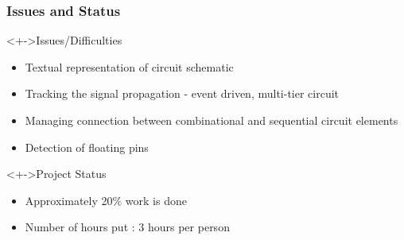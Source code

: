 \documentclass[10pt,red]{beamer}
\begin{document}
\begin{frame}
 \frametitle{Issues and Status}

\begin{block}<+->{Issues/Difficulties}
 \begin{itemize}
  \item Textual representation of circuit schematic
  \item Tracking the signal propagation - event driven, multi-tier circuit
  \item Managing connection between combinational and sequential circuit elements
  \item Detection of floating pins
 \end{itemize}

\end{block}



\begin{block}<+->{Project Status}
\begin{itemize}
 \item Approximately 20$\%$ work is done
 \item Number of hours put : 3 hours per person
\end{itemize}
\end{block}

\end{frame}



% 
% 
% 
% 
% 
% 
% 
% 
\end{document}
